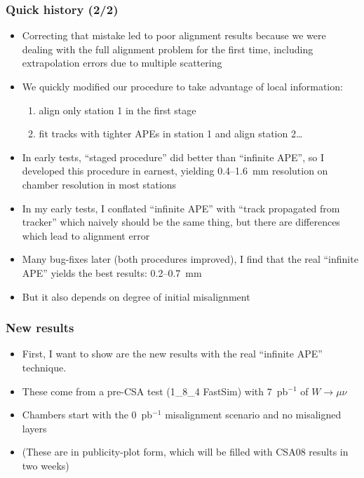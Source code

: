 \documentclass[compress]{beamer}
\begin{document}
\begin{frame}
\frametitle{Quick history (2/2)}

\small
\begin{itemize}
\item Correcting that mistake led to poor alignment results because we
were dealing with the full alignment problem for the first time,
including extrapolation errors due to multiple scattering
\item We quickly modified our procedure to take advantage of local information:
\begin{enumerate}
\item align only station 1 in the first stage
\item fit tracks with tighter APEs in station 1 and align station 2\ldots
\end{enumerate}

\item In early tests, ``staged procedure'' did better than ``infinite
APE'', so I developed this procedure in earnest, yielding 0.4--1.6~mm
resolution on chamber resolution in most stations

\item In my early tests, I conflated ``infinite APE'' with ``track
propagated from tracker'' which naively should be the same thing, but
there are differences which lead to alignment error

\item Many bug-fixes later (both procedures improved), I find that the
real ``infinite APE'' yields the best results: 0.2--0.7~mm

\item But it also depends on degree of initial misalignment

\end{itemize}
\end{frame}

\begin{frame}
\frametitle{New results}

\begin{itemize}\setlength{\itemsep}{0.25 cm}
\item First, I want to show are the new results with the real ``infinite APE'' technique.

\item These come from a pre-CSA test (1\_8\_4 FastSim) with
7~pb$^{-1}$ of $W\to\mu\nu$

\item Chambers start with the 0~pb$^{-1}$ misalignment scenario and
no misaligned layers

\item (These are in publicity-plot form, which will be filled with
CSA08 results in two weeks)
\end{itemize}

\end{frame}
\end{document}
